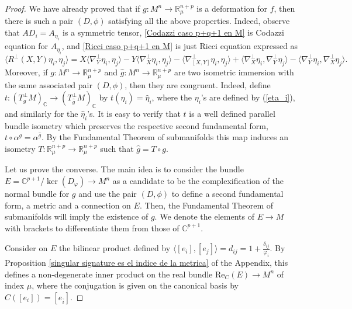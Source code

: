 \documentclass{article}
\theoremstyle{remark}
\begin{document}
\begin{proof}
    We have already proved that if $g:M^n\rightarrow\mathbb{R}^{n+p}_{\mu}$ is a deformation for $f$, then there is such a pair $(D,\phi)$ satisfying all the above properties. Indeed, observe that $AD_i=A_{\eta_i}$ is a symmetric tensor, \ref{Codazzi caso p+q+1 en M} is Codazzi equation for $A_{\eta_i}$, and \ref{Ricci caso p+q+1 en M} is just Ricci equation expressed as
    $$\langle R^\perp(X,Y)\eta_i,\eta_j\rangle=X\langle\nabla_Y^\perp \eta_i,\eta_j\rangle-Y\langle\nabla_X^\perp \eta_i,\eta_j\rangle-\langle\nabla_{[X,Y]}^\perp \eta_i,\eta_j\rangle+\langle\nabla_X^\perp\eta_i,\nabla_Y^\perp\eta_j\rangle-\langle\nabla_Y^\perp\eta_i,\nabla_X^\perp\eta_j\rangle.$$
    Moreover, if $g:M^n\rightarrow\mathbb{R}^{n+p}_{\mu}$ and $\hat{g}:M^n\rightarrow\mathbb{R}^{n+p}_{\mu}$ are two isometric immersion with the same associated pair $(D,\phi)$, then they are congruent. 
    Indeed, define $t:(T^\perp _gM)_{\mathbb{C}}\rightarrow (T^\perp _{\hat{g}}M)_{\mathbb{C}}$ by $t(\eta_i)=\hat{\eta}_i$, where the $\eta_i$'s are defined by (\ref{eta_i}), and similarly for the $\hat{\eta}_i$'s. It is easy to verify that $t$ is a well defined parallel bundle isometry which preserves the respective second fundamental form, $t\circ\alpha^g=\alpha^{\hat{g}}$. By the Fundamental Theorem of submanifolds this map induces an isometry $T:\mathbb{R}^{n+p}_{\mu}\rightarrow\mathbb{R}^{n+p}_{\mu}$ such that $\hat{g}=T\circ g$.
    
    Let us prove the converse. The main idea is to consider the bundle $E=\mathbb{C}^{p+1}/\ker(D_\varphi)\rightarrow M^n$ as a candidate to be the complexification of the normal bundle for $g$ and use the pair $(D,\phi)$ to define a second fundamental form, a metric and a connection on $E$. Then, the Fundamental Theorem of submanifolds will imply the existence of $g$. We denote the elements of $E\rightarrow M$ with brackets to differentiate them from those of $\mathbb{C}^{p+1}$. 
    
    Consider on $E$ the bilinear product defined by $\langle [e_i],[e_j]\rangle= d_{ij}=1+\frac{\delta_{ij}}{\varphi_i}$. By Proposition \ref{singular signature es el indice de la metrica} of the Appendix, this defines a non-degenerate inner product on the real bundle $\text{Re}_{C}(E)\rightarrow M^n$ of index $\mu$, where the conjugation is given on the canonical basis by $C([e_i])=[e_{\overline{i}}]$.
    

\end{proof}
\end{document}
